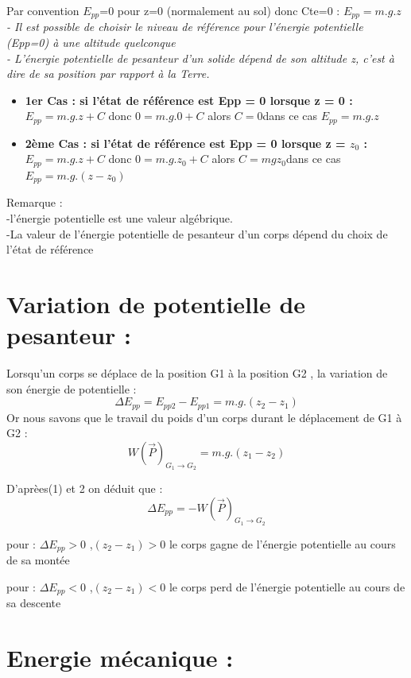 \documentclass[12pt]{article}
\begin{document}
Par convention $E_{pp}$=0 pour z=0 (normalement au sol) donc Cte=0 : $E_{pp} = m. g. z$
\em{
    \\- Il est possible de choisir le niveau de référence pour l'énergie potentielle (Epp=0) à une altitude quelconque}
\\\em{- L'énergie potentielle de pesanteur d'un solide dépend de son altitude z, c'est à dire de sa position par rapport à la Terre.
}

\begin{itemize}

    \item \textbf{1er Cas : si l'état de référence est Epp = 0 lorsque z = 0 :}
        \\{
            $E_{pp} = m.g.z + C$ donc $ 0 = m.g.0 + C$ alors $C = 0$dans ce cas $E_{pp}=m.g.z$ 
        }

    \item \textbf{2ème Cas : si l'état de référence est Epp = 0 lorsque z = $z_0$ :}
\\{
$E_{pp} = m.g.z + C$ donc $ 0 = m.g.z_0 + C$ alors $C = mgz_0$dans ce cas $E_{pp}=m.g.(z-z_0)$ 
        }
\end{itemize}
Remarque : 
\\-l'énergie potentielle est une valeur algébrique.
\\-La valeur de l'énergie potentielle de pesanteur d'un corps dépend du choix de l'état de référence


\section{Variation de potentielle de pesanteur : }

Lorsqu'un corps se déplace de la position G1 à la position G2 , la variation de son énergie de potentielle : $$\Delta E_{pp} = E_{pp2} - E_{pp1} = m.g.(z_2 - z_1)$$
Or nous savons que le travail du poids d'un corps durant le déplacement de G1 à G2 : 
$$W(\vec{P})_{G_1\rightarrow G_2} = m.g.(z_1 - z_2)$$

D'aprèes(1) et 2 on déduit que : $$\Delta E_{pp} = -  W(\vec{P})_{G_1 \rightarrow G_2}$$

pour : $\Delta E_{pp} > 0$ ,$(z_2 - z_1) > 0$ le corps gagne de l’énergie potentielle au cours de sa montée

pour : $\Delta E_{pp} < 0$ ,$(z_2 - z_1) < 0$ le corps perd de l’énergie potentielle au cours de sa descente

\section{Energie mécanique : }
\end{document}
